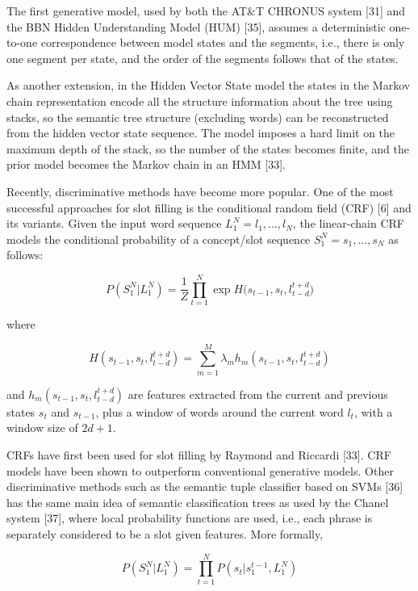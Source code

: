 The first generative model, used by both the AT\&T CHRONUS system [31] and the
BBN Hidden Understanding Model (HUM) [35], assumes a deterministic one-to-one
correspondence between model states and the segments, i.e., there is only one
segment per state, and the order of the segments follows that of the states.  

As another extension, in the Hidden Vector State model the states in the
Markov chain representation encode all the structure information about the
tree using stacks, so the semantic tree structure (excluding words) can be
reconstructed from the hidden vector state sequence. The model imposes a hard
limit on the maximum depth of the stack, so the number of the states becomes
finite, and the prior model becomes the Markov chain in an HMM [33].

Recently, discriminative methods have become more popular. One of the most
successful approaches for slot filling is the conditional random field (CRF)
[6] and its variants. Given the input word sequence $L_1^N=l_1,\dots,l_N$, the
linear-chain CRF models the conditional probability of a concept/slot sequence
$S_1^N=s_1,\dots,s_N$ as follows:

\begin{equation}
P(S_{1}^{N}\vert L_{1}^{N}) = \frac{1}{Z}\prod_{t=1}^{N}\exp{H(s_{t-1}, s_{t}, l_{t-d}^{t+d}})
\label{eq:crf1}
\end{equation}

where

\begin{equation}
H(s_{t-1}, s_{t}, l_{t-d}^{t+d}) = \sum_{m=1}^{M}\lambda_{m}h_{m}(s_{t-1}, s_{t}, l_{t-d}^{t+d})
\label{eq:crf2}
\end{equation}

and $h_m (s_{t-1},s_t,l_{t-d}^{t+d})$ are features extracted from the current and
previous states $s_t$ and $s_{t-1}$, plus a window of words around the current word
$l_t$, with a window size of $2d+1$.

CRFs have first been used for slot filling by Raymond and Riccardi [33]. CRF
models have been shown to outperform conventional generative models. Other
discriminative methods such as the semantic tuple classifier based on SVMs [36]
has the same main idea of semantic classification trees as used by the Chanel
system [37], where local probability functions are used, i.e., each phrase is
separately considered to be a slot given features. More formally,

\begin{equation}
P(S_{1}^{N}\vert L_{1}^{N}) = \prod_{t=1}^{N} P(s_{t} \vert s_{1}^{t-1}, L_{1}^{N})
\end{equation}

